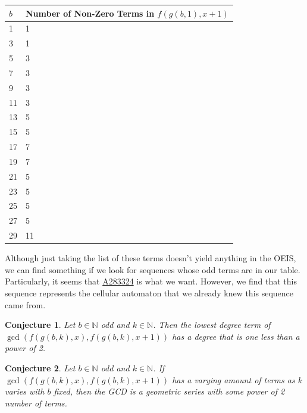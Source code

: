 \documentclass{article}
\newtheorem{conjecture}{Conjecture}
\newcommand{\N}{\mathbb{N}}
\begin{document}
	\begin{table}[H]
		\centering
		\begin{tabular}{|l||l|}
			\hline
			$b$ & Number of Non-Zero Terms in $f(g(b,1),x+1)$ \\
			\hline\hline
			1 & 1 \\
			\hline
			3 & 1 \\
			\hline
			5 & 3 \\
			\hline
			7 & 3 \\
			\hline
			9 & 3 \\
			\hline
			11 & 3 \\
			\hline
			13 & 5 \\
			\hline
			15 & 5 \\
			\hline
			17 & 7 \\
			\hline
			19 & 7 \\
			\hline
			21 & 5 \\
			\hline
			23 & 5 \\
			\hline
			25 & 5 \\
			\hline
			27 & 5 \\
			\hline
			29 & 11 \\
			\hline
		\end{tabular}
	\end{table}
	Although just taking the list of these terms doesn't yield anything in the OEIS, we can find something if we look for sequences whose odd terms are in our table.
	Particularly, it seems that \href{https://oeis.org/A283324}{A283324} is what we want.
	However, we find that this sequence represents the cellular automaton that we already knew this sequence came from.

	\begin{conjecture}
		Let $b \in \N$ odd and $k \in \N$. 
		Then the lowest degree term of $\gcd\left(f(g(b,k),x),f(g(b,k),x+1)\right)$ has a degree that is one less than a power of 2.
	\end{conjecture}

	\begin{conjecture}
		Let $b \in \N$ odd and $k \in \N$.
		If $\gcd\left(f(g(b,k),x),f(g(b,k),x+1)\right)$ has a varying amount of terms as $k$ varies with $b$ fixed, then the GCD is a geometric series with some power of 2 number of terms.
	\end{conjecture}
\end{document}
